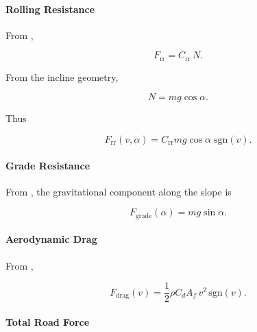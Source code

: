 \documentclass[11pt]{article}
\numberwithin{equation}{section}
\newcounter{theory}
\begin{document}
\paragraph{Rolling Resistance}

From ,

\begin{equation}
F_{\text{rr}} = C_{\text{rr}}\,N.
\label{eq:Frr_basic}
\end{equation}

From the incline geometry,

\begin{equation}
N = m g \cos\alpha.
\label{eq:normal_force}
\end{equation}

Thus

\begin{equation}
F_{\text{rr}}(v,\alpha)
=
C_{\text{rr}} m g \cos\alpha \;\mathrm{sgn}(v).
\label{eq:Frr_final}
\end{equation}

\paragraph{Grade Resistance}

From , the gravitational component along the slope is

\begin{equation}
F_{\text{grade}}(\alpha)
=
m g \sin\alpha.
\label{eq:Fgrade}
\end{equation}

\paragraph{Aerodynamic Drag}

From ,

\begin{equation}
F_{\text{drag}}(v)
=
\frac12 \rho C_d A_f \, v^2 \,\mathrm{sgn}(v).
\label{eq:Fdrag_final}
\end{equation}

\paragraph{Total Road Force}
\end{document}

